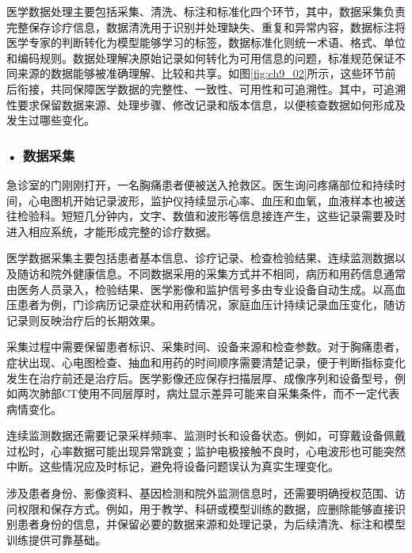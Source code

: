 医学数据处理主要包括采集、清洗、标注和标准化四个环节，其中，数据采集负责完整保存诊疗信息，数据清洗用于识别并处理缺失、重复和异常内容，数据标注将医学专家的判断转化为模型能够学习的标签，数据标准化则统一术语、格式、单位和编码规则。数据处理解决原始记录如何转化为可用信息的问题，标准规范保证不同来源的数据能够被准确理解、比较和共享。如图\ref{fig:ch9_02}所示，这些环节前后衔接，共同保障医学数据的完整性、一致性、可用性和可追溯性。其中，可追溯性要求保留数据来源、处理步骤、修改记录和版本信息，以便核查数据如何形成及发生过哪些变化。

\par
\noindent\begin{minipage}{\textwidth}
\centering
{}
\label{fig:ch9_02}
\end{minipage}
\par

\subsubsection*{\textbf{• 数据采集}}

急诊室的门刚刚打开，一名胸痛患者便被送入抢救区。医生询问疼痛部位和持续时间，心电图机开始记录波形，监护仪持续显示心率、血压和血氧，血液样本也被送往检验科。短短几分钟内，文字、数值和波形等信息接连产生，这些记录需要及时进入相应系统，才能形成完整的诊疗数据。

医学数据采集主要包括患者基本信息、诊疗记录、检查检验结果、连续监测数据以及随访和院外健康信息。不同数据采用的采集方式并不相同，病历和用药信息通常由医务人员录入，检验结果、医学影像和监护信号多由专业设备自动生成。以高血压患者为例，门诊病历记录症状和用药情况，家庭血压计持续记录血压变化，随访记录则反映治疗后的长期效果。

采集过程中需要保留患者标识、采集时间、设备来源和检查参数。对于胸痛患者，症状出现、心电图检查、抽血和用药的时间顺序需要清楚记录，便于判断指标变化发生在治疗前还是治疗后。医学影像还应保存扫描层厚、成像序列和设备型号，例如两次肺部CT使用不同层厚时，病灶显示差异可能来自采集条件，而不一定代表病情变化。

连续监测数据还需要记录采样频率、监测时长和设备状态。例如，可穿戴设备佩戴过松时，心率数据可能出现异常跳变；监护电极接触不良时，心电波形也可能突然中断。这些情况应及时标记，避免将设备问题误认为真实生理变化。

涉及患者身份、影像资料、基因检测和院外监测信息时，还需要明确授权范围、访问权限和保存方式。例如，用于教学、科研或模型训练的数据，应删除能够直接识别患者身份的信息，并保留必要的数据来源和处理记录，为后续清洗、标注和模型训练提供可靠基础。


